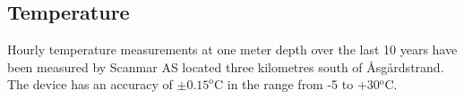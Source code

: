 \subsection{Temperature}
\label{subsec:tempeo}
Hourly temperature measurements at one meter depth over the last 10 years have been measured by Scanmar AS located three kilometres south of {\AA}sg{\aa}rdstrand. The device has an accuracy of $\pm 0.15^{\textrm{o}}$C in the range from -5 to +30$^{\textrm{o}}$C. 






